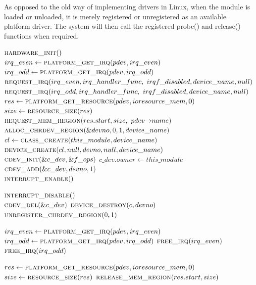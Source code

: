 
As opposed to the old way of implementing drivers in Linux, when the module is
loaded or unloaded, it is merely registered or unregistered as an available
platform driver. The system will then call the registered probe() and release()
functions when required.

\begin{algorithmic}
  \footnotesize
    \State $\Call{hardware\_init}{\null}$ \\

    \State $irq\_even \gets \Call{platform\_get\_irq}{pdev, irq\_even}$
    \State $irq\_odd \gets \Call{platform\_get\_irq}{pdev, irq\_odd}$
    \State $\Call{request\_irq}{irq\_even, irq\_handler\_func, \
      irqf\_disabled, device\_name, null}$
    \State $\Call{request\_irq}{irq\_odd, irq\_handler\_func, \
      irqf\_disabled, device\_name, null}$ \\

    \State $res \gets \Call{platform\_get\_resource}{pdev, ioresource\_mem, 0}$
    \State $size \gets \Call{resource\_size}{res}$
    \State $\Call{request\_mem\_region}{res.start,  size, \
      pdev{\rightarrow}name}$ \\

    \State $\Call{alloc\_chrdev\_region}{\&devno, 0, 1, device\_name}$ \\


    \State $cl \gets \Call{class\_create}{this\_module, device\_name}$
    \State $\Call{device\_create}{cl, null, devno, null, device\_name}$ \\

    \State $\Call{cdev\_init}{\&c\_dev, \&f\_ops}$
    \State $c\_dev.owner \gets this\_module$
    \State $\Call{cdev\_add}{\&c\_dev, devno, 1}$ \\

    \State $\Call{interrupt\_enable}{\null}$
  \EndFunction
\end{algorithmic}

\begin{algorithmic}
  \footnotesize
    \State $\Call{interrupt\_disable}{\null}$ \\
    \State $\Call{cdev\_del}{\&c\_dev}$
    \State $\Call{device\_destroy}{c, devno}$
    \State $\Call{unregister\_chrdev\_region}{0, 1}$

    \State $irq\_even \gets \Call{platform\_get\_irq}{pdev, irq\_even}$
    \State $irq\_odd \gets \Call{platform\_get\_irq}{pdev, irq\_odd}$
    \State $\Call{free\_irq}{irq\_even}$
    \State $\Call{free\_irq}{irq\_odd}$

    \State $res \gets \Call{platform\_get\_resource}{pdev, ioresource\_mem, 0}$
    \State $size \gets \Call{resource\_size}{res}$
    \State $\Call{release\_mem\_region}{res.start, size}$
  \EndFunction
\end{algorithmic}

